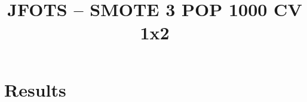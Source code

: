 \documentclass{llncs}
\title{JFOTS -- SMOTE 3 POP 1000 CV 1x2}
\begin{document}
\maketitle

\section{Results}
















\end{document}
